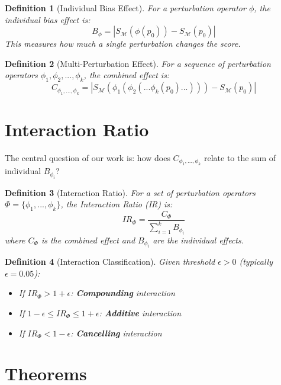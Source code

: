 \documentclass[11pt]{article}
\newtheorem{definition}{Definition}
\begin{document}
\begin{definition}[Individual Bias Effect]
For a perturbation operator $\phi$, the individual bias effect is:
\begin{equation}
B_\phi = |S_\mathcal{M}(\phi(p_0)) - S_\mathcal{M}(p_0)|
\end{equation}
This measures how much a single perturbation changes the score.
\end{definition}

\begin{definition}[Multi-Perturbation Effect]
For a sequence of perturbation operators $\phi_1, \phi_2, ..., \phi_k$, the combined effect is:
\begin{equation}
C_{\phi_1,...,\phi_k} = |S_\mathcal{M}(\phi_1(\phi_2(...\phi_k(p_0)...))) - S_\mathcal{M}(p_0)|
\end{equation}
\end{definition}

\section{Interaction Ratio}

The central question of our work is: how does $C_{\phi_1,...,\phi_k}$ relate to the sum of individual $B_{\phi_i}$?

\begin{definition}[Interaction Ratio]
For a set of perturbation operators $\Phi = \{\phi_1, ..., \phi_k\}$, the Interaction Ratio (IR) is:
\begin{equation}
IR_\Phi = \frac{C_\Phi}{\sum_{i=1}^k B_{\phi_i}}
\end{equation}
where $C_\Phi$ is the combined effect and $B_{\phi_i}$ are the individual effects.
\end{definition}

\begin{definition}[Interaction Classification]
Given threshold $\epsilon > 0$ (typically $\epsilon = 0.05$):
\begin{itemize}
    \item If $IR_\Phi > 1 + \epsilon$: \textbf{Compounding} interaction
    \item If $1 - \epsilon \leq IR_\Phi \leq 1 + \epsilon$: \textbf{Additive} interaction
    \item If $IR_\Phi < 1 - \epsilon$: \textbf{Cancelling} interaction
\end{itemize}
\end{definition}

\section{Theorems}
\end{document}
